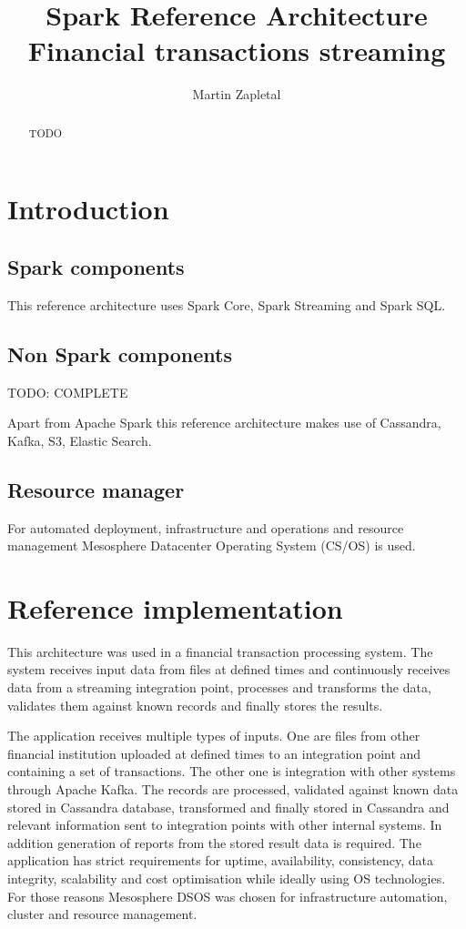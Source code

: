 \documentclass[a4paper, 10 pt, conference]{IEEEtran}
\title{Spark Reference Architecture \\ Financial transactions streaming}
\author{Martin Zapletal%
}
\begin{document}
\maketitle
\thispagestyle{empty}
\pagestyle{empty}

\begin{abstract}

TODO

\end{abstract}


\section{Introduction}

\subsection{Spark components}
This reference architecture uses Spark Core, Spark Streaming and Spark SQL.

\subsection{Non Spark components}
TODO: COMPLETE

Apart from Apache Spark this reference architecture makes use of Cassandra, Kafka, S3, Elastic Search.

\subsection{Resource manager}
For automated deployment, infrastructure and operations and resource management Mesosphere Datacenter Operating System (CS/OS) is used.

\section{Reference implementation}

This architecture was used in a financial transaction processing system. The system receives input data from files at defined times and continuously receives data from a streaming integration point, processes and transforms the data, validates them against known records and finally stores the results.

The application receives multiple types of inputs. One are files from other financial institution uploaded at defined times to an integration point and containing a set of transactions. The other one is integration with other systems through Apache Kafka. The records are processed, validated against known data stored in Cassandra database, transformed and finally stored in Cassandra and relevant information sent to integration points with other internal systems. In addition generation of reports from the stored result data is required. The application has strict requirements for uptime, availability, consistency, data integrity, scalability and cost optimisation while ideally using OS technologies. For those reasons Mesosphere DSOS was chosen for infrastructure automation, cluster and resource management.
\end{document}
